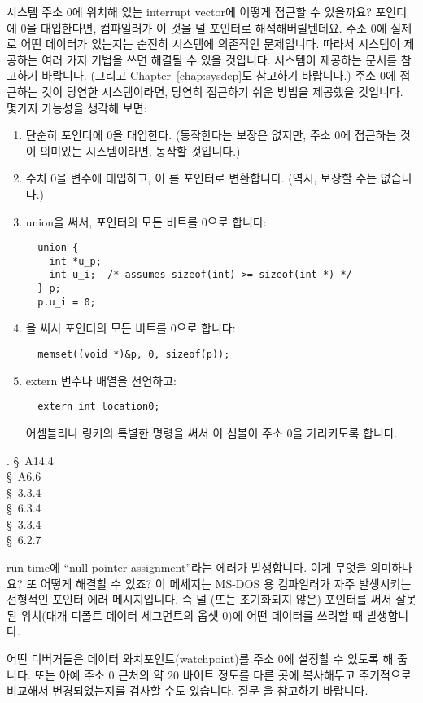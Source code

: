 \begin{faq}
	시스템 주소 0에 위치해 있는 interrupt vector에 어떻게 접근할 수
	있을까요? 포인터에 0을 대입한다면, 컴파일러가 이 것을 널 포인터로
	해석해버릴텐데요.
\A
	주소 0에 실제로 어떤 데이터가 있는지는 순전히 시스템에 의존적인
	문제입니다. 따라서 시스템이 제공하는 여러 가지 기법을 쓰면
	해결될 수 있을 것입니다. 시스템이 제공하는 문서를 참고하기 바랍니다.
	(그리고 Chapter~\ref{chap:sysdep}도 참고하기 바랍니다.)
        주소 0에 접근하는 것이 당연한
	시스템이라면, 당연히 접근하기 쉬운 방법을 제공했을 것입니다.
	몇가지 가능성을 생각해 보면:

\begin{enumerate}
	\item 단순히 포인터에 0을 대입한다. (동작한다는 보장은 없지만,
	  주소 0에 접근하는 것이 의미있는 시스템이라면, 동작할 것입니다.)
	\item 수치 0을  변수에 대입하고, 이 를 포인터로
	  변환합니다. (역시, 보장할 수는 없습니다.)
	\item union을 써서, 포인터의 모든 비트를 0으로 합니다:
	  \begin{verbatim}
  union {
    int *u_p;
    int u_i;  /* assumes sizeof(int) >= sizeof(int *) */
  } p;
  p.u_i = 0;  \end{verbatim}
	\item {}을 써서 포인터의 모든 비트를 0으로 합니다:
	  \begin{verbatim}
  memset((void *)&p, 0, sizeof(p)); \end{verbatim}
	  \item extern 변수나 배열을 선언하고:
	    \begin{verbatim}  extern int location0; \end{verbatim}
	    어셈블리나 링커의 특별한 명령을 써서 이 심볼이 주소 0을 가리키도록
	    합니다.
\end{enumerate}
	.
\R
	\cite{kr1} \S\ A14.4  \\
	\cite{kr2} \S\ A6.6  \\
	\cite{ansi} \S\ 3.3.4 \\
	\cite{c89} \S\ 6.3.4 \\
	\cite{rationale} \S\ 3.3.4 \\
	\cite{hs} \S\ 6.2.7 
\end{faq}

\begin{faq}
	run-time에 ``null pointer assignment''라는 에러가
	발생합니다.  이게 무엇을 의미하나요? 또 어떻게 해결할 수 있죠?
\A
	이 메세지는 MS-DOS 용 컴파일러가 자주 발생시키는 전형적인 포인터
	에러 메시지입니다.  즉 널 (또는 초기화되지 않은) 포인터를 써서
	잘못된 위치(대개 디폴트 데이터 세그먼트의 옵셋 0)에 어떤 데이터를
	쓰려할 때 발생합니다.

	어떤 디버거들은 데이터 와치포인트(watchpoint)를 주소 0에
	설정할 수 있도록 해 줍니다.  또는 아예 주소 0 근처의 약 20 바이트
	정도를 다른 곳에 복사해두고 주기적으로 비교해서 변경되었는지를
	검사할 수도 있습니다.  질문 을 참고하기 바랍니다.
\end{faq}

%
%
